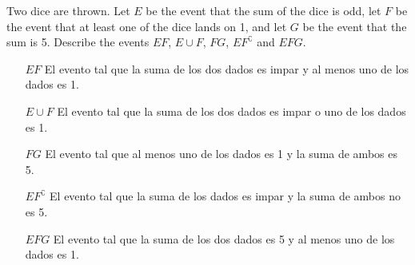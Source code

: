 \item Two dice are thrown. Let $E$ be the event that the sum of the dice is odd, let $F$ be the event that at least one of the dice lands on 1, and let $G$ be the event that the sum is 5. Describe the events $EF$, $E\cup F$, $FG$, $EF^\complement $ and $EFG$.

\begin{itemize}
    \item[$EF$] El evento tal que la suma de los dos dados es impar y al menos uno de los dados es 1.
    \item[$E\cup F$] El evento tal que la suma de los dos dados es impar o uno de los dados es 1.
    \item[$FG$] El evento tal que al menos uno de los dados es 1 y la suma de ambos es 5.
    \item[$EF^\complement $] El evento tal que la suma de los dados es impar y la suma de ambos no es 5.
    \item[$EFG$] El evento tal que la suma de los dos dados es 5 y al menos uno de los dados es 1.
\end{itemize}